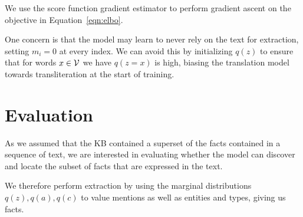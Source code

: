 \documentclass[12pt]{article}
\begin{document}
We use the score function gradient estimator to perform gradient ascent on the objective
in Equation~\ref{eqn:elbo}.

One concern is that the model may learn to never rely on the text for extraction,
setting $m_i = 0$ at every index.
We can avoid this by initializing $q(z)$ to ensure that for words $x \in \mathcal{V}$ 
we have $q(z = x)$ is high, biasing the translation model towards transliteration
at the start of training.

\section{Evaluation}
As we assumed that the KB contained a superset of the facts contained in
a sequence of text, we are interested in evaluating whether the model can discover
and locate the subset of facts that are expressed in the text.

We therefore perform extraction by using the marginal distributions
$q(z),q(a),q(c)$ to value mentions as well as entities and types,
giving us facts.

\begin{comment}

\subsection{Approximate the posterior of a generative model}
Alternatively, we may introduce a generative model of text $q(x, v)$ 
that inverts the relation extraction model $p(v \mid x)$ and optimize the following objective:
\begin{equation}
\log q(x,v) - KL[p(v,z,a,m \mid x) || q(v,z,a,m \mid x)]
\end{equation}
which entails training the generative model of text while approximating its
posterior with the information extraction system.

decompose the training of our extraction system $p(v\mid x)$ into two stages:
In the first stage we train $p(z,a,m\mid x,d)$ to approximate the posterior
of a conditional model of text given a complete KB $q(x,z,a,m \mid v,d)$.
This has the benefit of allowing us to exert control over where value mentions are detected
through our design of the text model $q$.

In the second stage, we have two choices:
a) train $p(v \mid z,a,m,x,d)$ to approximate the posterior of a full generative model of text and
the values of KB $q(x,v\mid d)$.
b) train $p(v \mid z,a,m,x,d)$ using the following lower bound:
\begin{equation}
\label{eqn:lowerbound2}
\log p(v\mid x,d) \geq
\Es{p(z,a,m\mid x,d)}{\log p(v\mid z,a,m, x,d)}
\end{equation}
Ideally the bound in Eqn.~\ref{eqn:lowerbound2}
should not be looser than the one presented in Eqn.~\ref{eqn:lowerbound},
as conditioning on the observed values of a KB should not reduce the entropy of
a good alignment model.

How do we split the gradient over time?

\end{comment}



\end{document}
